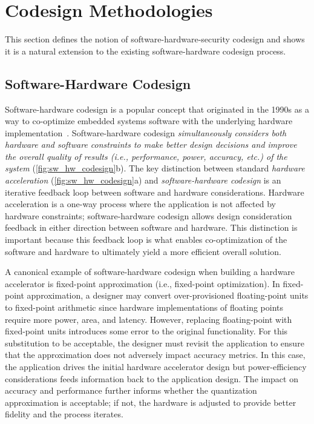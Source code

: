 \section{Codesign Methodologies}
\label{sec:background}

This section defines the notion of software-hardware-security codesign and shows it is a natural extension to the existing software-hardware codesign process.

\subsection{Software-Hardware Codesign}

Software-hardware codesign is a popular concept that originated in the 1990s as a way to co-optimize embedded systems software with the underlying hardware implementation~\cite{kalavade1993hardware}.
Software-hardware codesign \textit{simultaneously considers both hardware and software constraints to make better design decisions and improve the overall quality of results (i.e., performance, power, accuracy, etc.) of the system} (\autoref{fig:sw_hw_codesign}b).
The key distinction between standard \textit{hardware acceleration} (\autoref{fig:sw_hw_codesign}a) and \textit{software-hardware codesign} is an iterative feedback loop between software and hardware considerations.
Hardware acceleration is a one-way process where the application is not affected by hardware constraints; software-hardware codesign allows design consideration feedback in either direction between software and hardware.
This distinction is important because this feedback loop is what enables co-optimization of the software and hardware to ultimately yield a more efficient overall solution.

A canonical example of software-hardware codesign when building a hardware accelerator is fixed-point approximation (i.e., fixed-point optimization).
In fixed-point approximation, a designer may convert over-provisioned floating-point units to fixed-point arithmetic since hardware implementations of floating points require more power, area, and latency.
However, replacing floating-point with fixed-point units introduces some error to the original functionality.
For this substitution to be acceptable, the designer must revisit the application to ensure that the approximation does not adversely impact accuracy metrics.
In this case, the application drives the initial hardware accelerator design but power-efficiency considerations feeds information back to the application design.
The impact on accuracy and performance further informs whether the quantization approximation is acceptable; if not, the hardware is adjusted to provide better fidelity and the process iterates.

